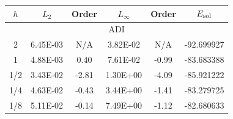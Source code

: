 \begin{table}[!t]
\centering
\begin{tabular}{c c c c c c }
\hline
$h$ & $L_2$ & Order & $L_\infty$& Order & $E_{\rm sol}$ \\ \hline
\multicolumn{6}{c}{ADI} \\ \hline
  2 & 6.45E-03 & N/A & 3.82E-02 & N/A & -92.699927 \\ %
  1 & 4.88E-03 & 0.40 & 7.61E-02 & -0.99& -83.683388 \\%
1/2 & 3.43E-02 & -2.81 & 1.30E+00 & -4.09 & -85.921222 \\ %
1/4 & 4.63E-02 & -0.43 & 3.44E+00 & -1.41 & -83.279725 \\ %
1/8 & 5.11E-02 & -0.14 & 7.49E+00 & -1.12 & -82.680633 \\ \hline


\end{tabular}
\end{table}
